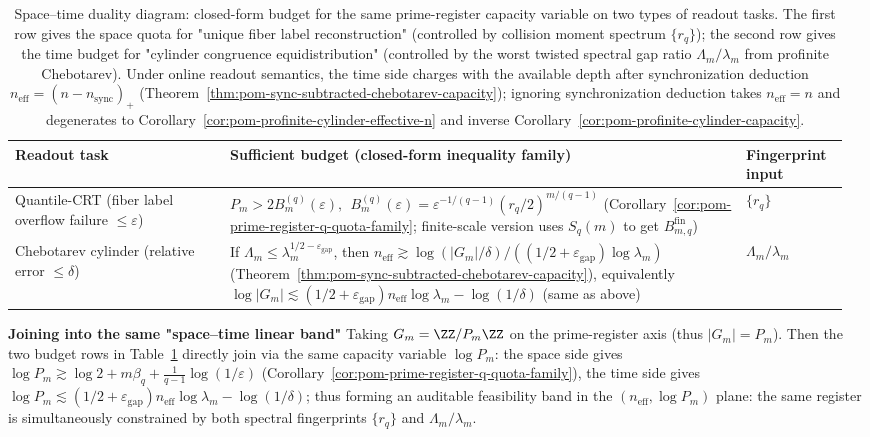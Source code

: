 \begin{table}[H]
\centering
\scriptsize
\setlength{\tabcolsep}{6pt}
\caption{Space–time duality diagram: closed-form budget for the same prime-register capacity variable on two types of readout tasks. The first row gives the space quota for "unique fiber label reconstruction" (controlled by collision moment spectrum $\{r_q\}$); the second row gives the time budget for "cylinder congruence equidistribution" (controlled by the worst twisted spectral gap ratio $\Lambda_m/\lambda_m$ from profinite Chebotarev). Under online readout semantics, the time side charges with the available depth after synchronization deduction $n_{\mathrm{eff}}=(n-n_{\mathrm{sync}})_+$ (Theorem~\ref{thm:pom-sync-subtracted-chebotarev-capacity}); ignoring synchronization deduction takes $n_{\mathrm{eff}}=n$ and degenerates to Corollary~\ref{cor:pom-profinite-cylinder-effective-n} and inverse Corollary~\ref{cor:pom-profinite-cylinder-capacity}.}
\label{tab:pom-space-time-duality-prime-register}
\begin{tabular}{p{0.25\linewidth} p{0.60\linewidth} p{0.12\linewidth}}
\toprule
Readout task & Sufficient budget (closed-form inequality family) & Fingerprint input\\
\midrule
Quantile-CRT (fiber label overflow failure $\le\varepsilon$) &
\(
P_m>2B_m^{(q)}(\varepsilon),
\ \
B_m^{(q)}(\varepsilon)=\varepsilon^{-1/(q-1)}(r_q/2)^{m/(q-1)}
\)
(Corollary~\ref{cor:pom-prime-register-q-quota-family}; finite-scale version uses $S_q(m)$ to get $B_{m,q}^{\mathrm{fin}}$) &
\(\{r_q\}\)\\

Chebotarev cylinder (relative error $\le\delta$) &
If $\Lambda_m\le \lambda_m^{1/2-\varepsilon_{\mathrm{gap}}}$, then
\(
n_{\mathrm{eff}}\gtrsim \log(|G_m|/\delta)/((1/2+\varepsilon_{\mathrm{gap}})\log\lambda_m)
\)
(Theorem~\ref{thm:pom-sync-subtracted-chebotarev-capacity}), equivalently
\(
\log|G_m|\lesssim (1/2+\varepsilon_{\mathrm{gap}})n_{\mathrm{eff}}\log\lambda_m-\log(1/\delta)
\)
(same as above) &
\(\Lambda_m/\lambda_m\)\\
\bottomrule
\end{tabular}
\end{table}

\noindent\textbf{Joining into the same "space–time linear band"}
Taking $G_m=\ZZ/P_m\ZZ$ on the prime-register axis (thus $|G_m|=P_m$).
Then the two budget rows in Table~\ref{tab:pom-space-time-duality-prime-register} directly join via the same capacity variable $\log P_m$: the space side gives
\(
\log P_m\gtrsim \log 2+m\beta_q+\frac{1}{q-1}\log(1/\varepsilon)
\)
(Corollary~\ref{cor:pom-prime-register-q-quota-family}), the time side gives
\(
\log P_m\lesssim (1/2+\varepsilon_{\mathrm{gap}})n_{\mathrm{eff}}\log\lambda_m-\log(1/\delta)
\);
thus forming an auditable feasibility band in the $(n_{\mathrm{eff}},\log P_m)$ plane: the same register is simultaneously constrained by both spectral fingerprints $\{r_q\}$ and $\Lambda_m/\lambda_m$.

